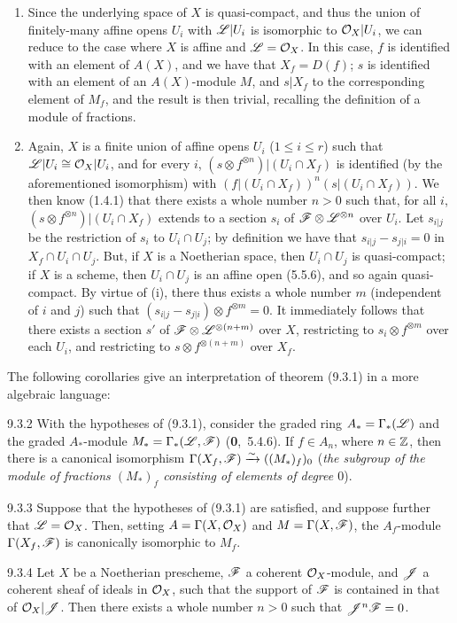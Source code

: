 \documentclass[../main.tex]{subfiles}
\begin{document}
\begin{enumerate}[label=\normalfont(\roman*)]
    \item Since the underlying space of $X$ is quasi-compact, and thus the union of finitely-many affine opens $U_i$ with $\mathscr{L}|U_i$ is isomorphic to $\mathcal{O}_X|U_i$, we can reduce to the case where $X$ is affine and $\mathscr{L}=\mathcal{O}_X$.
    In this case, $f$ is identified with an element of $A(X)$, and we have that $X_f=D(f)$; $s$ is identified with an element of an $A(X)$-module $M$, and $s|X_f$ to the corresponding element of $M_f$, and the result is then trivial, recalling the definition of a module of fractions.
    \item Again, $X$ is a finite union of affine opens $U_i$ ($1\leqslant i\leqslant r$) such that $\mathscr{L}|U_i\cong\mathcal{O}_X|U_i$, and for every $i$, $(s\otimes f^{\otimes n})|(U_i\cap X_f)$ is identified (by the aforementioned isomorphism) with $(f|(U_i\cap X_f))^n(s|(U_i\cap X_f))$.
    We then know (1.4.1) that there exists a whole number $n>0$ such that, for all $i$, $(s\otimes f^{\otimes n})|(U_i\cap X_f)$ extends to a section $s_i$ of $\mathscr{F}\otimes\mathscr{L}^{\otimes n}$ over $U_i$.
    Let $s_{i|j}$ be the restriction of $s_i$ to $U_i\cap U_j$; by definition we have that $s_{i|j}-s_{j|i}=0$ in $X_f\cap U_i\cap U_j$.
    But, if $X$ is a Noetherian space, then $U_i\cap U_j$ is quasi-compact; if $X$ is a scheme, then $U_i\cap U_j$ is an affine open (5.5.6), and so again quasi-compact.
    By virtue of (i), there thus exists a whole number $m$ (independent of $i$ and $j$) such that $(s_{i|j}-s_{j|i})\otimes f^{\otimes m}=0$.
    It immediately follows that there exists a section $s'$ of $\mathscr{F}\otimes\mathscr{L}^{\otimes(n+m)}$ over $X$, restricting to $s_i\otimes f^{\otimes m}$ over each $U_i$, and restricting to $s\otimes f^{\otimes(n+m)}$ over $X_f$.
\end{enumerate}
The following corollaries give an interpretation of theorem (9.3.1) in a more algebraic language:

\begin{cx}[Corollary]{9.3.2}
    With the hypotheses of {\normalfont(9.3.1)}, consider the graded ring $A_*=\Gamma_*(\mathscr{L})$ and the graded $A_*$-module $M_*=\Gamma_*(\mathscr{L},\mathscr{F})$ {\normalfont(\textbf{0},~5.4.6)}.
    If $f\in A_n$, where $n\in\mathbb{Z}$, then there is a canonical isomorphism $\Gamma(X_f,\mathscr{F})\xrightarrow{\sim}((M_*)_f)_0$ (\emph{the subgroup of the module of fractions $(M_*)_f$ consisting of elements of degree $0$}).
\end{cx}
\begin{cx}[Corollary]{9.3.3}
    Suppose that the hypotheses of {\normalfont(9.3.1)} are satisfied, and suppose further that $\mathscr{L}=\mathcal{O}_X$.
    Then, setting $A=\Gamma(X,\mathcal{O}_X)$ and $M=\Gamma(X,\mathscr{F})$, the $A_f$-module $\Gamma(X_f,\mathscr{F})$ is canonically isomorphic to $M_f$.
\end{cx}
\begin{cx}[Proposition]{9.3.4}
    Let $X$ be a Noetherian prescheme, $\mathscr{F}$ a coherent $\mathcal{O}_X$-module, and $\mathscr{J}$ a coherent sheaf of ideals in $\mathcal{O}_X$, such that the support of $\mathscr{F}$ is contained in that of $\mathcal{O}_X|\mathscr{J}$.
    Then there exists a whole number $n>0$ such that $\mathscr{J}^n\mathscr{F}=0$.
\end{cx}
\end{document}
